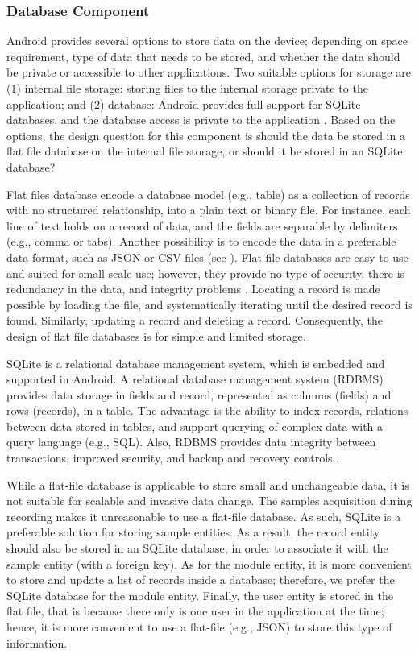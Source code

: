 \subsubsection{Database Component}\label{des:dc}

\noindent Android provides several options to store data on the device; depending on space requirement, type of data that needs to be stored, and whether the data should be private or accessible to other applications. Two suitable options for storage are (1) internal file storage: storing files to the internal storage private to the application; and (2) database: Android provides full support for SQLite databases, and the database access is private to the application \cite{android_storage}. Based on the options, the design question for this component is should the data be stored in a flat file database on the internal file storage, or should it be stored in an SQLite database?

Flat files database encode a database model (e.g., table) as a collection of records with no structured relationship, into a plain text or binary file. For instance, each line of text holds on a record of data, and the fields are separable by delimiters (e.g., comma or tabs). Another possibility is to encode the data in a preferable data format, such as JSON or CSV files (see ). Flat file databases are easy to use and suited for small scale use; however, they provide no type of security, there is redundancy in the data, and integrity problems \cite{flatfilerdbms}. Locating a record is made possible by loading the file, and systematically iterating until the desired record is found. Similarly, updating a record and deleting a record. Consequently, the design of flat file databases is for simple and limited storage.

SQLite is a relational database management system, which is embedded and supported in Android. A relational database management system (RDBMS) provides data storage in fields and record, represented as columns (fields) and rows (records), in a table. The advantage is the ability to index records, relations between data stored in tables, and support querying of complex data with a query language (e.g., SQL). Also, RDBMS provides data integrity between transactions, improved security, and backup and recovery controls \cite{flatfilerdbms}. 

While a flat-file database is applicable to store small and unchangeable data, it is not suitable for scalable and invasive data change. The samples acquisition during recording makes it unreasonable to use a flat-file database. As such, SQLite is a preferable solution for storing sample entities. As a result, the record entity should also be stored in an SQLite database, in order to associate it with the sample entity (with a foreign key). As for the module entity, it is more convenient to store and update a list of records inside a database; therefore, we prefer the SQLite database for the module entity. Finally, the user entity is stored in the flat file, that is because there only is one user in the application at the time; hence, it is more convenient to use a flat-file (e.g., JSON) to store this type of information.

